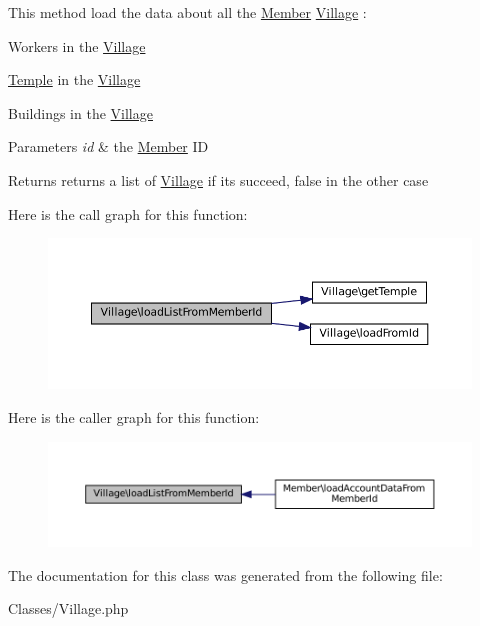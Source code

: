 This method load the data about all the \mbox{\hyperlink{classMember}{Member}} \mbox{\hyperlink{classVillage}{Village}} \+: 


\begin{DoxyItemize}
\item Workers in the \mbox{\hyperlink{classVillage}{Village}}
\item \mbox{\hyperlink{classTemple}{Temple}} in the \mbox{\hyperlink{classVillage}{Village}}
\item Buildings in the \mbox{\hyperlink{classVillage}{Village}} 
\begin{DoxyParams}{Parameters}
{\em id} & the \mbox{\hyperlink{classMember}{Member}} ID \\
\hline
\end{DoxyParams}
\begin{DoxyReturn}{Returns}
returns a list of \mbox{\hyperlink{classVillage}{Village}} if it\textquotesingle{}s succeed, false in the other case 
\end{DoxyReturn}

\end{DoxyItemize}Here is the call graph for this function\+:
\nopagebreak
\begin{figure}[H]
\begin{center}
\leavevmode
\includegraphics[width=350pt]{classVillage_a1cedfa6d0cc4f8c432265c5b8309f931_cgraph}
\end{center}
\end{figure}
Here is the caller graph for this function\+:
\nopagebreak
\begin{figure}[H]
\begin{center}
\leavevmode
\includegraphics[width=350pt]{classVillage_a1cedfa6d0cc4f8c432265c5b8309f931_icgraph}
\end{center}
\end{figure}


The documentation for this class was generated from the following file\+:\begin{DoxyCompactItemize}
\item 
Classes/Village.\+php\end{DoxyCompactItemize}
